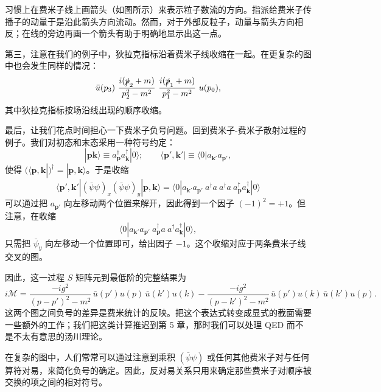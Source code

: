 习惯上在费米子线上画箭头（如图所示）来表示粒子数流的方向。指派给费米子传播子的动量于是沿此箭头方向流动。然而，对于外部反粒子，动量与箭头方向相反；在线的旁边再画一个箭头有助于明确地显示出这一点。

第三，注意在我们的例子中，狄拉克指标沿着费米子线收缩在一起。在更复杂的图中也会发生同样的情况：
\begin{equation}
  \bar{u}(p_3)\ \frac{i(\slashed{p}_2+m)}{p_2^2-m^2}\
    \frac{i(\slashed{p}_1+m)}{p_1^2-m^2}\ u(p_0) ,
  \label{eq:4.119}
\end{equation}
其中狄拉克指标按场沿线出现的顺序收缩。

最后，让我们花点时间担心一下费米子负号问题。回到费米子-费米子散射过程的例子。我们对初态和末态采用一种符号约定：
\begin{equation}
  |\mathbf{p}\mathbf{k}\rangle \equiv a_{\mathbf{p}}^\dagger
    a_{\mathbf{k}}^\dagger|0\rangle;\qquad
  \langle \mathbf{p}',\mathbf{k}'| \equiv \langle 0|a_{\mathbf{k}'}
    a_{\mathbf{p}'} ,
  \label{eq:4.120}
\end{equation}
使得 $(\langle\mathbf{p},\mathbf{k}|)^\dagger = |\mathbf{p},\mathbf{k}\rangle$。于是收缩
\begin{equation}
  \langle \mathbf{p}',\mathbf{k}'|(\bar{\psi}\psi)_x(\bar{\psi}\psi)_y
    |\mathbf{p},\mathbf{k}\rangle
  = \langle 0|a_{\mathbf{k}'}a_{\mathbf{p}'}\ a^\dagger a\ a^\dagger a\
    a_{\mathbf{p}}^\dagger a_{\mathbf{k}}^\dagger|0\rangle
\end{equation}
可以通过把 $a_{\mathbf{p}'}$ 向左移动两个位置来解开，因此得到一个因子 $(-1)^2 = +1$。但注意，在收缩
\begin{equation}
  \langle 0|a_{\mathbf{k}'}a_{\mathbf{p}'}\ a_{\mathbf{p}}^\dagger a\ a^\dagger
    a_{\mathbf{k}}^\dagger|0\rangle ,
\end{equation}
只需把 $\bar{\psi}_y$ 向左移动一个位置即可，给出因子 $-1$。这个收缩对应于两条费米子线交叉的图。

因此，这一过程 $S$ 矩阵元到最低阶的完整结果为
\begin{equation}
  i\mathcal{M} = \frac{-ig^2}{(p-p')^2-m^2}\,
    \bar{u}(p')u(p)\,\bar{u}(k')u(k)
    - \frac{-ig^2}{(p-k')^2-m^2}\,
    \bar{u}(p')u(k)\,\bar{u}(k')u(p) .
  \label{eq:4.121}
\end{equation}
这两个图之间负号的差异是费米统计的反映。把这个表达式转变成显式的截面需要一些额外的工作；我们把这类计算推迟到第 5 章，那时我们可以处理 QED 而不是不太有意思的汤川理论。

在复杂的图中，人们常常可以通过注意到乘积 $(\bar{\psi}\psi)$ 或任何其他费米子对与任何算符对易，来简化负号的确定。因此，反对易关系只用来确定那些费米子对顺序被交换的项之间的相对符号。

